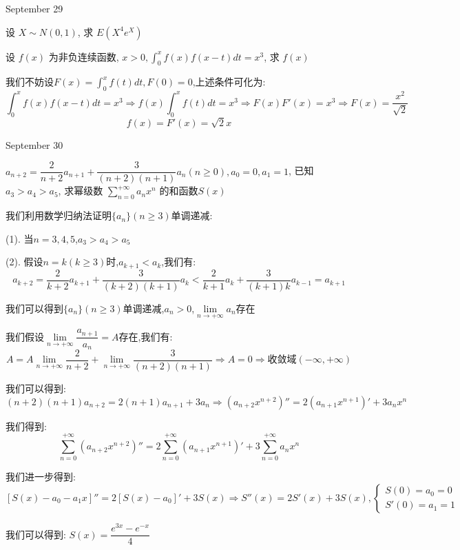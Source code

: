 \textcolor{purplea}{September 29}

\begin{example}[][Exam: 35.4.15]
	设 $X\sim N(0,1)$, 求 $E(X^4e^{X})$
\end{example}

\begin{solution}
	
\end{solution}

\begin{example}[][Exam: 35.4.16]
	设 $f(x)$ 为非负连续函数, $x>0, \int_{0}^{x}f(x)f(x-t)dt=x^3$, 求 $f(x)$ 
\end{example}
\begin{solution}

	我们不妨设$F(x)=\int_{0}^{x}f(t)dt,F(0)=0$,上述条件可化为:  
	$$\int_{0}^{x}f(x)f(x-t)dt=x^3\Rightarrow f(x)\int_{0}^{x}f(t)dt=x^3\Rightarrow F(x)F'(x)=x^3\Rightarrow F(x)=\dfrac{x^2}{\sqrt{2}}$$
	$$f(x)=F'(x)=\sqrt{2}x$$
\end{solution}


\textcolor{purplea}{September 30}

\begin{example}[][Exam: 35.4.17]
	$a_{n+2}=\dfrac{2}{n+2}a_{n+1}+\dfrac{3}{(n+2)(n+1)}a_{n}(n\geq 0), a_{0}=0,a_{1}=1$,
	已知 $a_{3}>a_{4}>a_{5}$, 求幂级数 $\sum\limits_{n=0}^{+\infty}a_{n}x^n$ 的和函数$S(x)$
\end{example}
\begin{solution}

	我们利用数学归纳法证明$\{a_{n}\}(n\geq 3)$单调递减:  
	
	(1). 当$n=3,4,5$,$a_{3}>a_{4}>a_{5}$
	
	(2). 假设$n=k(k\geq 3)$时,$a_{k+1}<a_{k}$,我们有:  
	$$a_{k+2}=\dfrac{2}{k+2}a_{k+1}+\dfrac{3}{(k+2)(k+1)}a_{k}<\dfrac{2}{k+1}a_{k}+\dfrac{3}{(k+1)k}a_{k-1}=a_{k+1}$$
	
	我们可以得到$\{a_{n}\}(n\geq 3)$单调递减,$a_{n}>0$,$\lim\limits_{n\to+\infty}a_{n}$存在
	
	我们假设$\lim\limits_{n\to+\infty}\dfrac{a_{n+1}}{a_{n}}=A$存在,我们有:  
	$$A=A\lim\limits_{n\to+\infty}\dfrac{2}{n+2}+\lim\limits_{n\to+\infty}\dfrac{3}{(n+2)(n+1)}\Rightarrow A=0\Rightarrow \text{收敛域}(-\infty,+\infty)$$
	
	我们可以得到:  
	$$(n+2)(n+1)a_{n+2}=2(n+1)a_{n+1}+3a_{n}\Rightarrow (a_{n+2}x^{n+2})''=2(a_{n+1}x^{n+1})'+3a_{n}x^n$$
	
	我们得到:  $$\sum\limits_{n=0}^{+\infty}(a_{n+2}x^{n+2})''=2\sum\limits_{n=0}^{+\infty}(a_{n+1}x^{n+1})'+3\sum\limits_{n=0}^{+\infty}a_{n}x^n$$
	
	我们进一步得到:  
	$$[S(x)-a_{0}-a_{1}x]''=2[S(x)-a_{0}]'+3S(x)\Rightarrow S''(x)=2S'(x)+3S(x),\left\lbrace
	\begin{array}{l}
		S(0)=a_{0}=0\\
		S'(0)=a_{1}=1
	\end{array}
	\right. $$
	
	我们可以得到:  $S(x)=\dfrac{e^{3x}-e^{-x}}{4}$
\end{solution}

